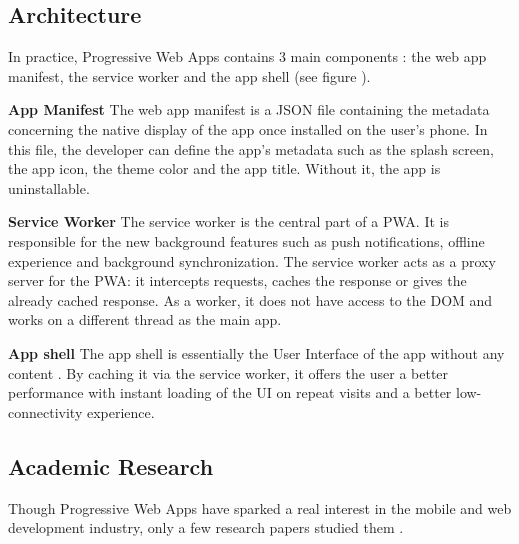 \documentclass{kththesis}
\begin{document}
\subsection{Architecture}

In practice, Progressive Web Apps contains 3 main components : the web app manifest, the service worker and the app shell (see figure ).

\medskip
\textbf{App Manifest} \newline
The web app manifest is a JSON file containing the metadata concerning the native display of the app once installed on the user's phone. In this file, the developer can define the app's metadata such as the splash screen, the app icon, the theme color and the app title. Without it, the app is uninstallable.

\medskip
\textbf{Service Worker} \newline
The service worker is the central part of a PWA. It is responsible for the new background features such as push notifications, offline experience and background synchronization\cite{SW_def}. The service worker acts as a proxy server for the PWA: it intercepts requests, caches the response or gives the already cached response. As a worker, it does not have access to the DOM and works on a different thread as the main app. 

\medskip
\textbf{App shell} \newline
The app shell is essentially the User Interface of the app without any content \cite{AppShell_def}. By caching it via the service worker, it offers the user a better performance with instant loading of the UI on repeat visits and a better low-connectivity experience.


\subsection{Academic Research} 


Though Progressive Web Apps have sparked a real interest in the mobile and web development industry, only a few research papers studied them\cite{PWApossibleUnifer} \cite{Biorn-Hansen2} \cite{Biorn-Hansen3}.
\end{document}
